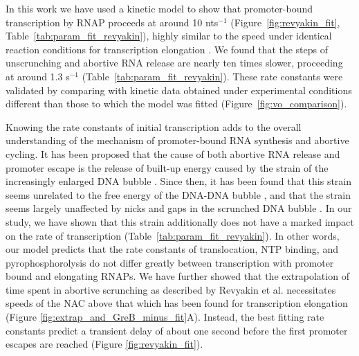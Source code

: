 %
In this work we have used a kinetic model to show that promoter-bound
transcription by RNAP proceeds at around 10 nts$^{-1}$
(Figure~\ref{fig:revyakin_fit}, Table~\ref{tab:param_fit_revyakin}), highly
similar to the speed under identical reaction conditions for
transcription elongation \cite{revyakin_abortive_2006}. We found that 
the steps of unscrunching and abortive RNA release are nearly ten times
slower, proceeding at around 1.3 s$^{-1}$ (Table~\ref{tab:param_fit_revyakin}).
These rate constants were validated by comparing with kinetic data obtained
under experimental conditions different than those to which the model was
fitted (Figure~\ref{fig:vo_comparison}).

Knowing the rate constants of initial transcription adds to the overall
understanding of the mechanism of promoter-bound RNA synthesis and abortive
cycling. It has been proposed that the cause of both abortive RNA release and
promoter escape is the release of built-up energy caused by the strain of the
increasingly enlarged DNA bubble
\cite{straney_stressed_1987,hsu_promoter_2002,revyakin_abortive_2006}. Since
then, it has been found that this strain seems unrelated to the free energy of
the DNA-DNA bubble \cite{hsu_initial_2006, skancke_sequence-dependent_2015},
and that the strain seems largely unaffected by nicks and gaps in the
scrunched DNA bubble \cite{samanta_insights_2013}. In our study, we have shown
that this strain additionally does not have a marked impact on the rate of
transcription (Table~\ref{tab:param_fit_revyakin}). In other words, our model
predicts that the rate constants of translocation, NTP binding, and
pyrophosphorolysis do not differ greatly between transcription with promoter
bound and elongating RNAPs. We have further showed that the extrapolation
of time spent in abortive scrunching as described by Revyakin et al.
necessitates speeds of the NAC above that which has been found for
transcription elongation (Figure \ref{fig:extrap_and_GreB_minus_fit}A).
Instead, the best fitting rate constants predict a transient delay of about
one second before the first promoter escapes are reached (Figure
\ref{fig:revyakin_fit}).

